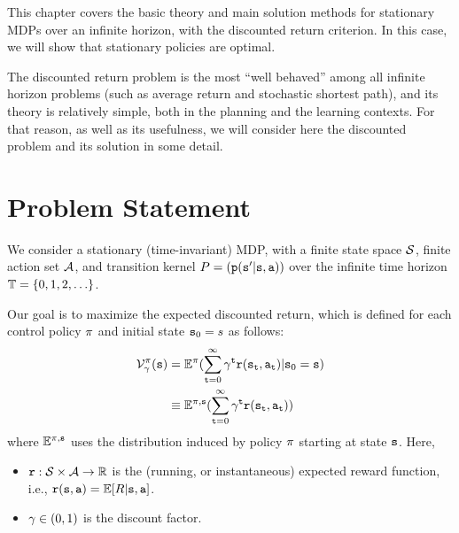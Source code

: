 This chapter covers the basic theory and main solution methods for
stationary MDPs over an infinite horizon, with the discounted return
criterion. In this case, we will show that stationary policies are
optimal.

The discounted return problem is the most ``well behaved'' among all
infinite horizon problems (such as average return and stochastic
shortest path), and its theory is relatively simple, both in
the planning and the learning contexts. For that reason, as well as
its usefulness, we will consider here the discounted problem and its
solution in some detail.


\section{Problem Statement}\label{sec:inf_horizon_prob}

We consider a stationary (time-invariant) MDP, with a finite state
space $\mathcal{S}$, finite action set $\mathcal{A}$, and transition kernel
$P = ({\tt p}({\tt s}'|{\tt s},{\tt a}))$ over the infinite time horizon
${\mathbb{T}} = \{ 0,1,2, \ldots \} $.

Our goal is to maximize the expected discounted return, which is
defined for each control policy $\pi $ and initial state
${{\tt s}_0} = s$ as follows:
\begin{align*}
\mathcal{V}_\gamma ^\pi ({\tt s}) &= {\mathbb{E}^\pi }(\sum\limits_{{\tt t} = 0}^\infty  {{\gamma^{\tt t}}{\tt r}({{\tt s}_{\tt t}},{{\tt a}_{\tt t}})} |{{\tt s}_0} = {\tt s})\\
 &\equiv {\ensuremath{\mathbb{E}}^{\pi,{\tt s}}}(\sum\limits_{{\tt t} = 0}^\infty  {{\gamma^{\tt t}}{\tt r}({{\tt s}_{\tt t}},{{\tt a}_{\tt t}})} )
\end{align*}
where $\mathbb{E}^{\pi ,{\tt s}}$ uses the distribution induced by policy
$\pi$ starting at state ${\tt s}$. Here,
\begin{itemize}
  \item ${\tt r} : \mathcal{S} \times \mathcal{A} \to \mathbb R$ is the (running, or instantaneous) expected reward function, i.e., ${\tt r}({\tt s},{\tt a})=\mathbb{E}[R|{\tt s},{\tt a}]$.
  \item $\gamma  \in (0,1)$ is the discount factor.
\end{itemize}

